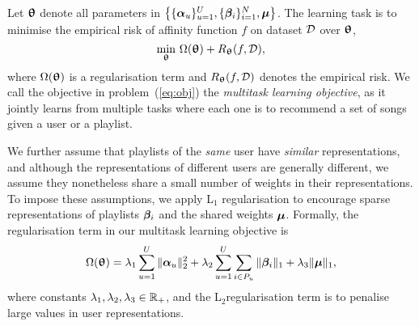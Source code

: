 Let ${\bm{\uptheta}}$ denote all parameters in $\left\{ \{{\bm{\alpha}}_u\}_{u=1}^U, \{{\bm{\beta}}_i\}_{i=1}^N, \bm{\mu} \right\}$.
The learning task is to minimise the empirical risk of affinity function $f$ on dataset $\mathcal{D}$ over ${\bm{\uptheta}}$,
\ie %
\begin{equation}
\label{eq:obj}
\min_{\bm{\uptheta}} \, \Omega({\bm{\uptheta}}) + R_{\bm{\uptheta}}(f, \mathcal{D}),
\end{equation}
where $\Omega({\bm{\uptheta}})$ is a regularisation term and $R_{\bm{\uptheta}}(f, \mathcal{D})$ denotes the empirical risk.
We call the objective in problem~(\ref{eq:obj}) the {\it multitask learning objective},
as it jointly learns from multiple tasks where each one is to recommend a set of songs given a user or a playlist.


We further assume that playlists of the \emph{same} user have \emph{similar} representations,
and although the representations of different users are generally different,
we assume they nonetheless share a small number of weights in their representations.
To impose these assumptions, we apply L$_1$ regularisation to encourage sparse representations of playlists ${\bm{\beta}}_i$ %
and the shared weights $\bm{\mu}$.
%
Formally, the regularisation term in our multitask learning objective is
\begin{equation}
\label{eq:reg}
\Omega({\bm{\uptheta}}) = \lambda_1 \sum_{u=1}^U \|{\bm{\alpha}}_u\|_2^2 + \lambda_2 \sum_{u=1}^U \sum_{i \in P_u} \|{\bm{\beta}}_i\|_1 + \lambda_3 \| \bm{\mu} \|_1,
\end{equation}
where constants $\lambda_1, \lambda_2, \lambda_3 \in \mathbb{R}_+$,
and the L$_2$regularisation term is to penalise large values in user representations.


